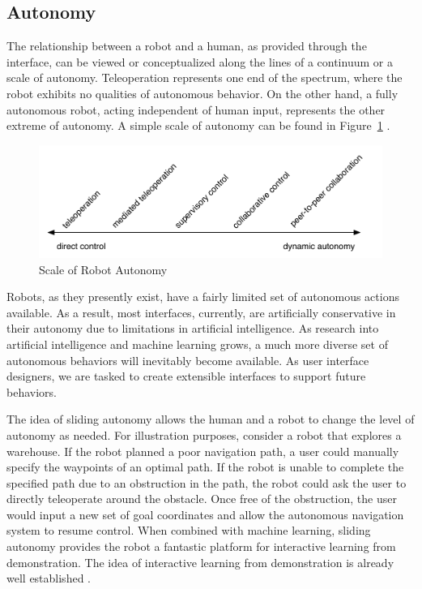 \subsection{Autonomy}

The relationship between a robot and a human, as provided through the interface, can be viewed or conceptualized along the lines of a continuum or a scale of autonomy. Teleoperation represents one end of the spectrum, where the robot exhibits no qualities of autonomous behavior. On the other hand, a fully autonomous robot, acting independent of human input, represents the other extreme of autonomy. A simple scale of autonomy can be found in Figure~\ref{fig:autonomy} \cite{Goodrich_Survey}.


\begin{figure}[ht]
\begin{center}
\includegraphics[width=5in]{images/autonomy.pdf}
\caption{Scale of Robot Autonomy\label{fig:autonomy}}
\end{center}
\end{figure}

Robots, as they presently exist, have a fairly limited set of autonomous actions available. As a result, most interfaces, currently, are artificially conservative in their autonomy due to limitations in artificial intelligence. As research into artificial intelligence and machine learning grows, a much more diverse set of autonomous behaviors will inevitably become available. As user interface designers, we are tasked to create extensible interfaces to support future behaviors.

The idea of sliding autonomy allows the human and a robot to change the level of autonomy as needed. For illustration purposes, consider a robot that explores a warehouse. If the robot planned a poor navigation path, a user could manually specify the waypoints of an optimal path. If the robot is unable to complete the specified path due to an obstruction in the path, the robot could ask the user to directly teleoperate around the obstacle. Once free of the obstruction, the user would input a new set of goal coordinates and allow the autonomous navigation system to resume control. When combined with machine learning, sliding autonomy provides the robot a fantastic platform for interactive learning from demonstration. The idea of interactive learning from demonstration is already well established \cite{GWAP} \cite{Grollman}.

